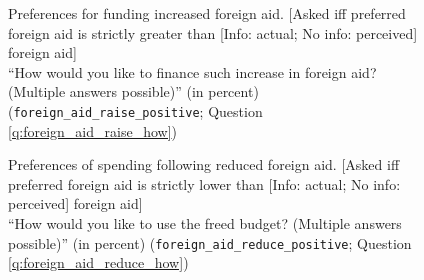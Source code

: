 \begin{figure}[h!]
    \cprotect\caption[Preferences for funding increased foreign aid]{Preferences for funding increased foreign aid. [Asked iff preferred foreign aid is strictly greater than [Info: actual; No info: perceived] foreign aid] \\ ``How would you like to finance such increase in foreign aid? (Multiple answers possible)'' (in percent) (\verb|foreign_aid_raise_positive|; Question \ref{q:foreign_aid_raise_how})  %
    }\label{fig:foreign_aid_raise_how}
\end{figure}

\begin{figure}[h!]
    \cprotect\caption[Preferences of spending following reduced foreign aid]{Preferences of spending following reduced foreign aid. [Asked iff preferred foreign aid is strictly lower than [Info: actual; No info: perceived] foreign aid] \\ ``How would you like to use the freed budget? (Multiple answers possible)'' (in percent) (\verb|foreign_aid_reduce_positive|; Question \ref{q:foreign_aid_reduce_how})  %
    }\label{fig:foreign_aid_reduce_how}
\end{figure}

